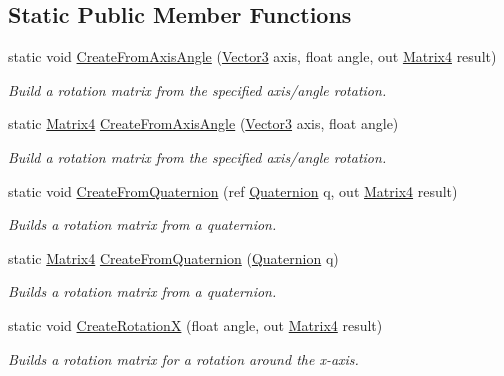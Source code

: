 \subsection*{Static Public Member Functions}
\begin{DoxyCompactItemize}
\item 
static void \hyperlink{struct_open_t_k_1_1_matrix4_a319f627e55e08a459c41dd3915c7e8a4}{Create\-From\-Axis\-Angle} (\hyperlink{struct_open_t_k_1_1_vector3}{Vector3} axis, float angle, out \hyperlink{struct_open_t_k_1_1_matrix4}{Matrix4} result)
\begin{DoxyCompactList}\small\item\em Build a rotation matrix from the specified axis/angle rotation. \end{DoxyCompactList}\item 
static \hyperlink{struct_open_t_k_1_1_matrix4}{Matrix4} \hyperlink{struct_open_t_k_1_1_matrix4_ab8d8dac78759db89a53d23d3fff5b699}{Create\-From\-Axis\-Angle} (\hyperlink{struct_open_t_k_1_1_vector3}{Vector3} axis, float angle)
\begin{DoxyCompactList}\small\item\em Build a rotation matrix from the specified axis/angle rotation. \end{DoxyCompactList}\item 
static void \hyperlink{struct_open_t_k_1_1_matrix4_a3dca5241b1140ba2e7b208d418400eff}{Create\-From\-Quaternion} (ref \hyperlink{struct_open_t_k_1_1_quaternion}{Quaternion} q, out \hyperlink{struct_open_t_k_1_1_matrix4}{Matrix4} result)
\begin{DoxyCompactList}\small\item\em Builds a rotation matrix from a quaternion. \end{DoxyCompactList}\item 
static \hyperlink{struct_open_t_k_1_1_matrix4}{Matrix4} \hyperlink{struct_open_t_k_1_1_matrix4_a6370103adfbda8af7b85ac9311dd6b2d}{Create\-From\-Quaternion} (\hyperlink{struct_open_t_k_1_1_quaternion}{Quaternion} q)
\begin{DoxyCompactList}\small\item\em Builds a rotation matrix from a quaternion. \end{DoxyCompactList}\item 
static void \hyperlink{struct_open_t_k_1_1_matrix4_a5a2844395cee08584523a50c2d18510f}{Create\-Rotation\-X} (float angle, out \hyperlink{struct_open_t_k_1_1_matrix4}{Matrix4} result)
\begin{DoxyCompactList}\small\item\em Builds a rotation matrix for a rotation around the x-\/axis. \end{DoxyCompactList}\item 

\end{DoxyCompactItemize}
